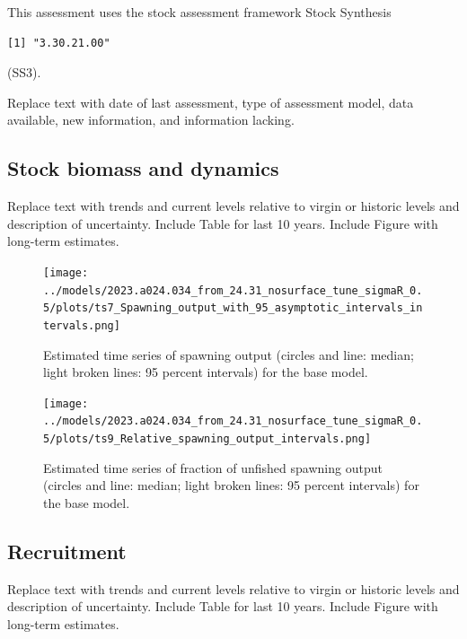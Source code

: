 \documentclass[11pt,
  english,
  letterpaper,
]{article}
\begin{document}
This assessment uses the stock assessment framework Stock Synthesis

\begin{verbatim}
[1] "3.30.21.00"
\end{verbatim}

(SS3).

Replace text with date of last assessment, type of assessment model, data available, new information, and information lacking.

\hypertarget{stock-biomass-and-dynamics}{%
\subsection*{Stock biomass and dynamics}\label{stock-biomass-and-dynamics}}

Replace text with trends and current levels relative to virgin or historic levels and description of uncertainty. Include Table for last 10 years. Include Figure with long-term estimates.



\begin{figure}
\centering
\texttt{[image: ../models/2023.a024.034\_from\_24.31\_nosurface\_tune\_sigmaR\_0.5/plots/ts7\_Spawning\_output\_with\_95\_asymptotic\_intervals\_intervals.png]}
\caption{Estimated time series of spawning output (circles and line: median; light broken lines: 95 percent intervals) for the base model.\label{fig:es-ssb}}
\end{figure}

\begin{figure}
\centering
\texttt{[image: ../models/2023.a024.034\_from\_24.31\_nosurface\_tune\_sigmaR\_0.5/plots/ts9\_Relative\_spawning\_output\_intervals.png]}
\caption{Estimated time series of fraction of unfished spawning output (circles and line: median; light broken lines: 95 percent intervals) for the base model.\label{fig:es-depl}}
\end{figure}

\clearpage

\hypertarget{recruitment}{%
\subsection*{Recruitment}\label{recruitment}}

Replace text with trends and current levels relative to virgin or historic levels and description of uncertainty. Include Table for last 10 years. Include Figure with long-term estimates.
\end{document}
